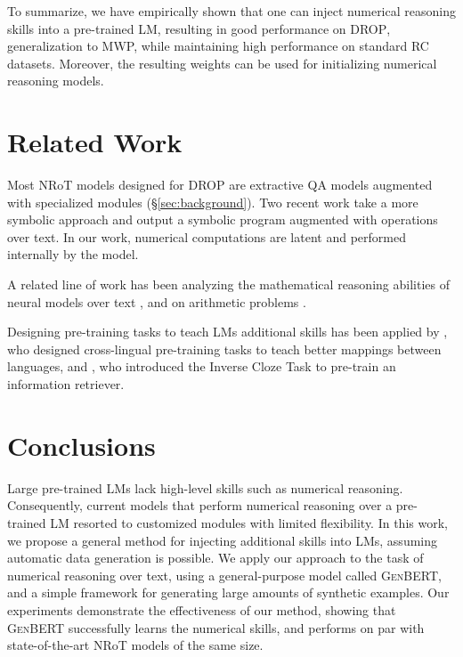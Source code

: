 \documentclass[11pt,a4paper]{article}
\newcommand\genbert{\textsc{GenBERT}}
\newcommand\drop{\textsc{DROP}}
\begin{document}
To summarize, we have empirically shown that one 
can inject numerical reasoning skills into a pre-trained LM, resulting in good performance on \drop{}, generalization to MWP, while maintaining high performance on standard RC datasets. Moreover, the resulting weights can be used for initializing numerical reasoning models. \section{Related Work}









Most NRoT models designed for \drop{} are extractive QA models augmented with specialized modules (\S\ref{sec:background}).
Two recent work \cite{andor2019giving, chen2020neural} take a more symbolic approach and output a symbolic program augmented with operations over text.
In our work, numerical computations are latent and performed internally by the model.

A related line of work has been analyzing the mathematical reasoning abilities of neural models over text \cite{wallace2019numeracy, rozen2019diversify, ravichander2019equate}, and on arithmetic problems \cite{saxton2019analysing, amini2019mathqa,lample2020deep}.

Designing pre-training tasks to teach LMs additional skills has been applied by \citet{huang2019unicoder}, who designed cross-lingual pre-training tasks to teach better mappings between languages, and \citet{lee2019latent}, who introduced the Inverse Cloze Task to pre-train an information retriever. 
 \section{Conclusions}
Large pre-trained LMs lack high-level skills such as numerical reasoning. Consequently, current models that perform numerical reasoning over a pre-trained LM resorted to customized modules with limited flexibility.
In this work, we propose a general method for injecting additional skills into LMs, assuming automatic data generation is possible.
We apply our approach to the task of numerical reasoning over text, using a general-purpose model called \genbert{}, and a simple framework for generating large amounts of synthetic examples.
Our experiments demonstrate the effectiveness of our method, showing that \genbert{} successfully learns the numerical skills, and performs on par with state-of-the-art NRoT models of the same size.
 
\end{document}
